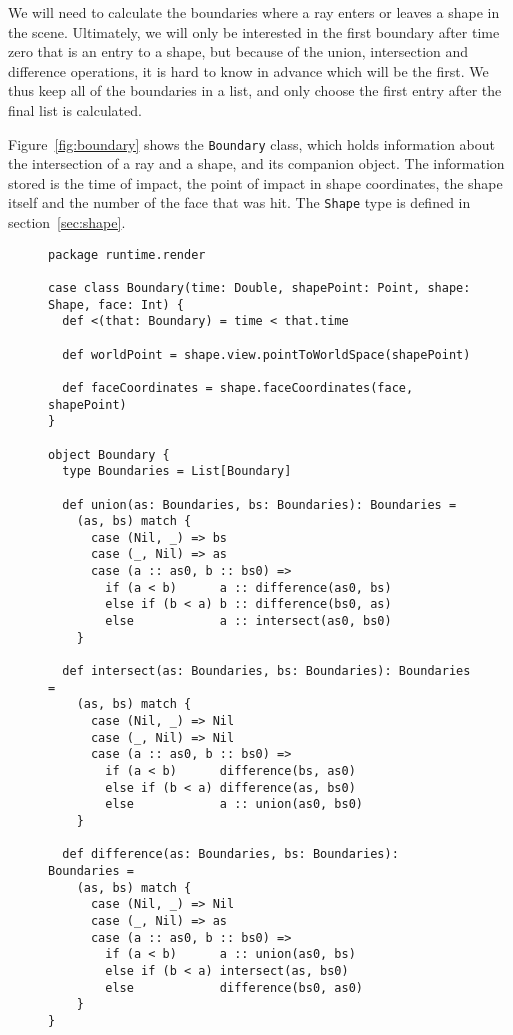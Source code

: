 We will need to calculate the boundaries
where a ray enters or leaves a shape in the scene.
Ultimately, we will only be interested in
the first boundary after time zero that is an entry to a shape,
but because of the union, intersection and difference operations,
it is hard to know in advance which will be the first.
We thus keep all of the boundaries in a list,
and only choose the first entry after the final list is calculated.

Figure~\ref{fig:boundary} shows the \verb!Boundary! class,
which holds information about the intersection of a ray and a shape,
and its companion object.
The information stored is the time of impact,
the point of impact in shape coordinates,
the shape itself and the number of the face that was hit.
The \verb!Shape! type is defined in section~\ref{sec:shape}.

\begin{figure}
\begin{verbatim}
package runtime.render

case class Boundary(time: Double, shapePoint: Point, shape: Shape, face: Int) {
  def <(that: Boundary) = time < that.time

  def worldPoint = shape.view.pointToWorldSpace(shapePoint)

  def faceCoordinates = shape.faceCoordinates(face, shapePoint)
}

object Boundary {
  type Boundaries = List[Boundary]
  
  def union(as: Boundaries, bs: Boundaries): Boundaries =
    (as, bs) match {
      case (Nil, _) => bs
      case (_, Nil) => as
      case (a :: as0, b :: bs0) =>
        if (a < b)      a :: difference(as0, bs)
        else if (b < a) b :: difference(bs0, as)
        else            a :: intersect(as0, bs0)
    }

  def intersect(as: Boundaries, bs: Boundaries): Boundaries =
    (as, bs) match {
      case (Nil, _) => Nil
      case (_, Nil) => Nil
      case (a :: as0, b :: bs0) =>
        if (a < b)      difference(bs, as0)
        else if (b < a) difference(as, bs0)
        else            a :: union(as0, bs0)
    }

  def difference(as: Boundaries, bs: Boundaries): Boundaries =
    (as, bs) match {
      case (Nil, _) => Nil
      case (_, Nil) => as
      case (a :: as0, b :: bs0) =>
        if (a < b)      a :: union(as0, bs)
        else if (b < a) intersect(as, bs0)
        else            difference(bs0, as0)
    }
}
\end{verbatim}
\getcaption
\end{figure}

